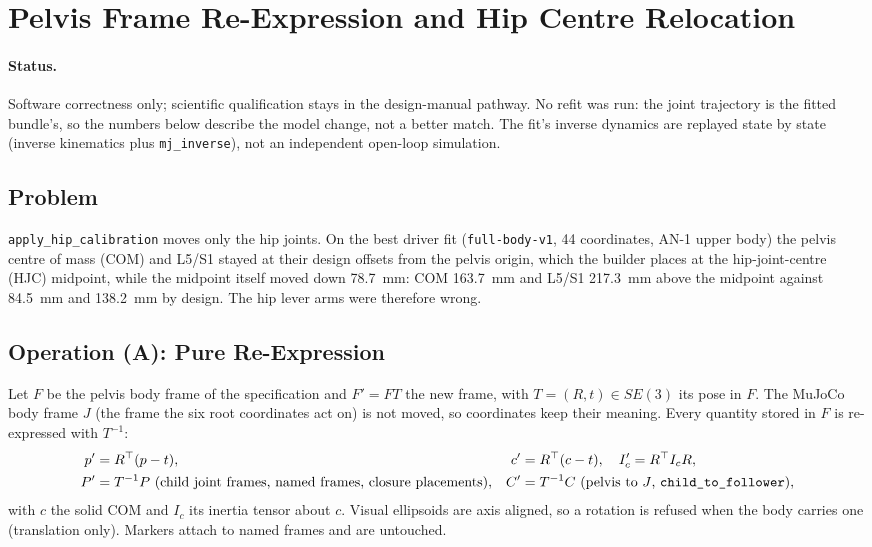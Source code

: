 \section{Pelvis Frame Re-Expression and Hip Centre Relocation}
\label{sec:hrg-pelvis-frame}

\paragraph{Status.} Software correctness only; scientific qualification stays in the
design-manual pathway. No refit was run: the joint trajectory is the fitted bundle's,
so the numbers below describe the model change, not a better match. The fit's inverse
dynamics are replayed state by state (inverse kinematics plus \texttt{mj\_inverse}),
not an independent open-loop simulation.

\subsection{Problem}
\texttt{apply\_hip\_calibration} moves only the hip joints. On the best driver fit
(\texttt{full-body-v1}, 44 coordinates, AN-1 upper body) the pelvis centre of mass
(COM) and L5/S1 stayed at their design offsets from the pelvis origin, which the
builder places at the hip-joint-centre (HJC) midpoint, while the midpoint itself moved
down 78.7~mm: COM 163.7~mm and L5/S1 217.3~mm above the midpoint against 84.5~mm and
138.2~mm by design. The hip lever arms were therefore wrong.

\subsection{Operation (A): Pure Re-Expression}
Let $F$ be the pelvis body frame of the specification and $F'=FT$ the new frame, with
$T=(R,t)\in SE(3)$ its pose in $F$. The MuJoCo body frame $J$ (the frame the six root
coordinates act on) is not moved, so coordinates keep their meaning. Every quantity
stored in $F$ is re-expressed with $T^{-1}$:
\begin{align}
  p' &= R^\top (p - t), &
  c' &= R^\top (c - t),\quad I'_{c} = R^\top I_{c} R, \\
  P' &= T^{-1} P \text{ (child joint frames, named frames, closure placements)}, &
  C' &= T^{-1} C \text{ (pelvis to $J$, \texttt{child\_to\_follower})},
\end{align}
with $c$ the solid COM and $I_c$ its inertia tensor about $c$. Visual ellipsoids are
axis aligned, so a rotation is refused when the body carries one (translation only).
Markers attach to named frames and are untouched.

